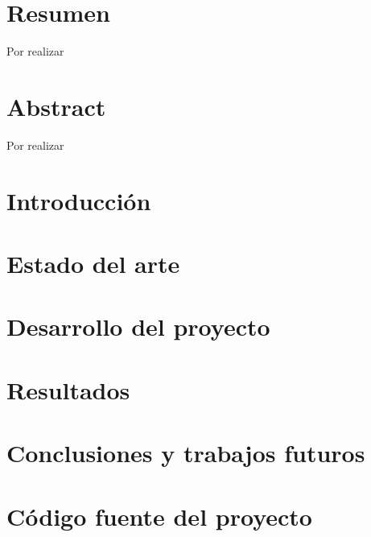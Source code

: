 \documentclass[a4paper]{report}
\newcommand\paginablanco{%
    \null
    \thispagestyle{empty}%
    \newpage}
\begin{document}
\chapter*{Resumen} %
Por realizar

\chapter*{Abstract} %
Por realizar

\tableofcontents
\newpage
\listoftables %
\newpage
\listoffigures
\newpage

\paginablanco{}

\chapter{Introducción}

\chapter{Estado del arte}

\chapter{Desarrollo del proyecto}

\chapter{Resultados}

\chapter{Conclusiones y trabajos futuros}

\newpage


\appendix
\clearpage
\addappheadtotoc
\appendixpage

\chapter{Código fuente del proyecto}

\end{document}
